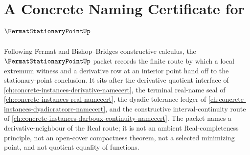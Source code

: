 \chapter{A Concrete Naming Certificate for $\FermatStationaryPointUp$}
\label{ch:concrete-instances-fermat-stationary-point-namecert}

Following Fermat and Bishop--Bridges constructive calculus, the $\FermatStationaryPointUp$ packet records the finite route by which a local extremum witness and a derivative row at an interior point hand off to the stationary-point conclusion. It sits after the derivative quotient interface of \autoref{ch:concrete-instances-derivative-namecert}, the terminal real-name seal of \autoref{ch:concrete-instances-real-namecert}, the dyadic tolerance ledger of \autoref{ch:concrete-instances-dyadicratcore-namecert}, and the constructive interval-continuity route of \autoref{ch:concrete-instances-darboux-continuity-namecert}. The packet names a derivative-neighbour of the Real route; it is not an ambient Real-completeness principle, not an open-cover compactness theorem, not a selected minimizing point, and not quotient equality of functions.

